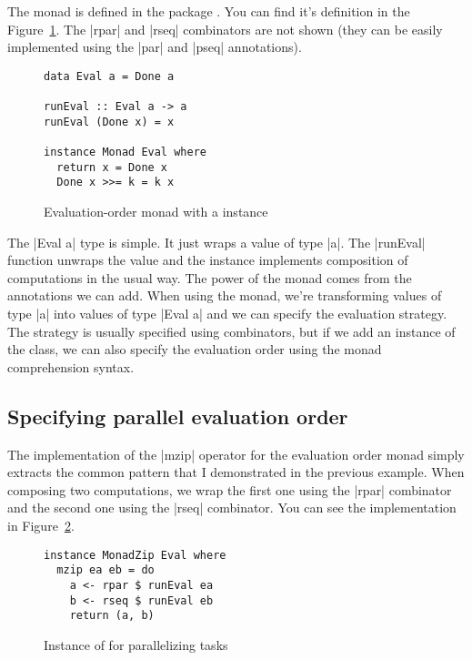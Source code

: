 \documentclass{tmr}
\begin{document}
The  monad is defined in the  package
\cite{parallelpkg}. You can find it's definition in the Figure~\ref{fig:eval-monad}. The |rpar| 
and |rseq| combinators are not shown (they can be easily implemented using the |par| and |pseq| 
annotations). 

\begin{figure}
\begin{verbatim}
data Eval a = Done a

runEval :: Eval a -> a
runEval (Done x) = x

instance Monad Eval where
  return x = Done x
  Done x >>= k = k x
\end{verbatim}
\caption{ Evaluation-order monad  with a 
           instance }
\label{fig:eval-monad}
\end{figure}

The |Eval a| type is simple. It just wraps a value of type |a|. The |runEval| function unwraps the 
value and the  instance implements composition of computations in the 
usual way. The power of the monad comes from the annotations we can add. When using the monad, 
we're transforming values of type |a| into values of type |Eval a| and we can specify the 
evaluation strategy. The strategy is usually specified using combinators, but if we add an instance 
of the  class, we can also specify the evaluation order using the
monad comprehension syntax.


\subsection{Specifying parallel evaluation order}

The implementation of the |mzip| operator for the evaluation order monad simply extracts the 
common pattern that I demonstrated in the previous example. When composing two computations, we
wrap the first one using the |rpar| combinator and the second one using the |rseq| combinator.
You can see the implementation in Figure~\ref{fig:eval-zip}.

\begin{figure}
\begin{verbatim}
instance MonadZip Eval where
  mzip ea eb = do
    a <- rpar $ runEval ea
    b <- rseq $ runEval eb
    return (a, b)
\end{verbatim}
\caption{Instance of  for parallelizing tasks}
\label{fig:eval-zip}
\end{figure}
\end{document}
